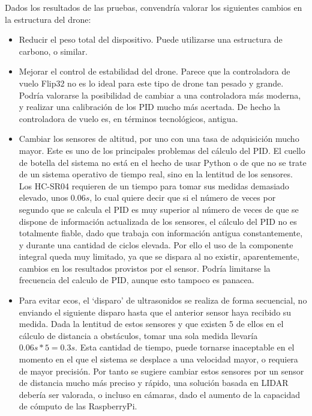 Dados los resultados de las pruebas, convendría valorar los siguientes cambios en la estructura del drone: 
\begin{itemize}
\item Reducir el peso total del dispositivo. Puede utilizarse una estructura de carbono, o similar.
\item Mejorar el control de estabilidad del drone. Parece que la controladora de vuelo Flip32 no es lo ideal para este tipo de drone tan pesado y grande. Podría valorarse la posibilidad de cambiar a una controladora más moderna, y realizar una calibración de los PID mucho más acertada. De hecho la controladora de vuelo es, en términos tecnológicos, antigua.
\item Cambiar los sensores de altitud, por uno con una tasa de adquisición mucho mayor. Este es uno de los principales problemas del cálculo del PID. El cuello de botella del sistema no está en el hecho de usar Python o de que no se trate de un sistema operativo de tiempo real, sino en la lentitud de los sensores. Los HC-SR04 requieren de un tiempo para tomar sus medidas demasiado elevado, unos $0.06s$, lo cual quiere decir que si el número de veces por segundo que se calcula el PID es muy superior al número de veces de que se dispone de información actualizada de los sensores, el cálculo del PID no es totalmente fiable, dado que trabaja con información antigua constantemente, y durante una cantidad de ciclos elevada. Por ello el uso de la componente integral queda muy limitado, ya que se dispara al no existir, aparentemente, cambios en los resultados provistos por el sensor. Podría limitarse la frecuencia del calculo de PID, aunque esto tampoco es panacea. 
\item Para evitar ecos, el `disparo' de ultrasonidos se realiza de forma secuencial, no enviando el siguiente disparo hasta que el anterior sensor haya recibido su medida. Dada la lentitud de estos sensores y que existen 5 de ellos en el cálculo de distancia a obstáculos, tomar una sola medida llevaría $0.06s * 5 = 0.3s$. Esta cantidad de tiempo, puede tornarse inaceptable en el momento en el que el sistema se desplace a una velocidad mayor, o requiera de mayor precisión. Por tanto se sugiere cambiar estos sensores por un sensor de distancia mucho más preciso y rápido, una solución basada en LIDAR debería ser valorada, o incluso en cámaras, dado el aumento de la capacidad de cómputo de las RaspberryPi.
\end{itemize}




